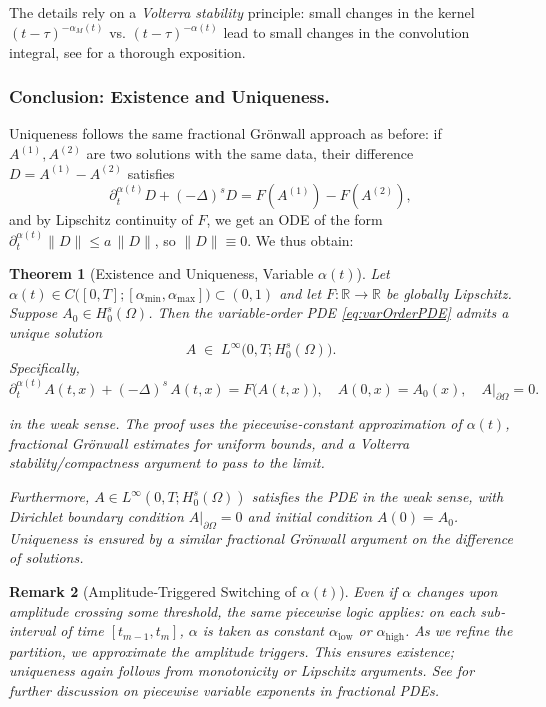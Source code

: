 \documentclass[12pt]{article}
\newtheorem{theorem}{Theorem}[section]
\newtheorem{remark}[theorem]{Remark}
\begin{document}
The details rely on a \emph{Volterra stability} principle: small changes in the kernel
\((t-\tau)^{-\alpha_M(t)}\) vs. \((t-\tau)^{-\alpha(t)}\) lead to small changes in the
convolution integral, see \cite{Sun2019} for a thorough exposition.

\subsubsection{Conclusion: Existence and Uniqueness.}
Uniqueness follows the same fractional Grönwall approach as before:
if \(A^{(1)},A^{(2)}\) are two solutions with the same data, their difference
\(D=A^{(1)}-A^{(2)}\) satisfies
\[
\partial_t^{\alpha(t)} D + (-\Delta)^s D = F(A^{(1)})-F(A^{(2)}),
\]
and by Lipschitz continuity of \(F\), we get an ODE of the form
\(\partial_t^{\alpha(t)} \|D\|\le a\,\|D\|\), so \(\|D\|\equiv0\). We thus obtain:

\begin{theorem}[Existence and Uniqueness, Variable \(\alpha(t)\)]
\label{thm:VarOrderExist_expanded}
Let \(\alpha(t)\in C\bigl([0,T];[\alpha_{\min},\alpha_{\max}]\bigr)\subset(0,1)\) and let
\(F:\mathbb{R}\to\mathbb{R}\) be globally Lipschitz. Suppose \(A_0\in H_0^s(\Omega)\). Then the
variable‐order PDE \eqref{eq:varOrderPDE} admits a unique solution
\[
A \;\in\; L^\infty\bigl(0,T;H_0^s(\Omega)\bigr).
\]
Specifically,
\begin{equation}
\label{eq:varOrderPDE}
\partial_t^{\alpha(t)} A(t,x)
+ 
(-\Delta)^s\,A(t,x)
=
F\bigl(A(t,x)\bigr),
\quad
A(0,x)=A_0(x),
\quad
A\big|_{\partial\Omega}=0.
\end{equation}


in the weak sense.  The proof uses the piecewise‐constant approximation of \(\alpha(t)\),
fractional Grönwall estimates for uniform bounds, and a Volterra stability/compactness
argument to pass to the limit.

Furthermore, \(A\in L^\infty(0,T;H_0^s(\Omega))\) satisfies the PDE in the weak sense, with 
Dirichlet boundary condition \(A|_{\partial\Omega} = 0\) and initial condition \(A(0)=A_0\). 
Uniqueness is ensured by a similar fractional Grönwall argument on the difference of solutions.

\end{theorem}

\begin{remark}[Amplitude‐Triggered Switching of \(\alpha(t)\)]
Even if \(\alpha\) changes upon amplitude crossing some threshold, the same piecewise
logic applies: on each sub‐interval of time \([t_{m-1},t_m]\), \(\alpha\) is taken as
constant \(\alpha_{\mathrm{low}}\) or \(\alpha_{\mathrm{high}}\). As we refine the
partition, we approximate the amplitude triggers. This ensures existence; uniqueness
again follows from monotonicity or Lipschitz arguments. See \cite{Sun2019} for further
discussion on piecewise variable exponents in fractional PDEs.
\end{remark}
\end{document}
